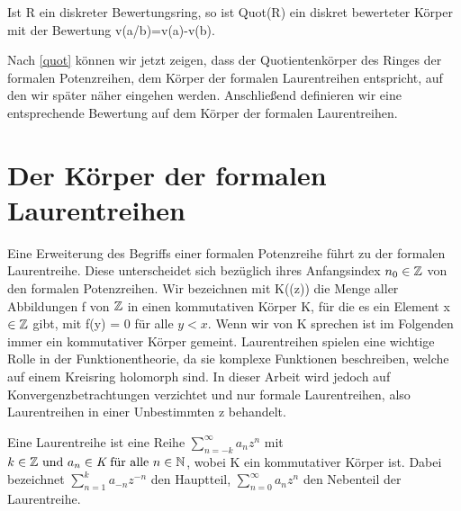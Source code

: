 \begin{satz}\label{quotbewring}
Ist R ein diskreter Bewertungsring, so ist Quot(R) ein diskret bewerteter Körper mit der Bewertung v(a/b)=v(a)-v(b). 
\end{satz}
Nach \ref{quot} können wir jetzt zeigen, dass der Quotientenkörper des Ringes der formalen Potenzreihen, dem Körper der formalen Laurentreihen entspricht, auf den wir später näher eingehen werden. Anschließend definieren wir eine entsprechende Bewertung auf dem Körper der formalen Laurentreihen.


\section{Der Körper der formalen Laurentreihen}
%
Eine Erweiterung des Begriffs einer formalen Potenzreihe führt zu der formalen Laurentreihe. Diese unterscheidet sich bezüglich ihres Anfangsindex $n_0 \in \mathbb{Z}$ von den formalen Potenzreihen. Wir bezeichnen mit K((z)) die Menge aller Abbildungen f von $\mathbb{Z}$ in einen kommutativen Körper K, für die es ein Element x $\in \mathbb{Z}$ gibt, mit f(y) = 0 für alle $y < x $. Wenn wir von K sprechen ist im Folgenden immer ein kommutativer Körper gemeint. \newline 
Laurentreihen spielen eine wichtige Rolle in der Funktionentheorie, da sie komplexe Funktionen beschreiben, welche auf einem Kreisring holomorph sind. In dieser Arbeit wird jedoch auf Konvergenzbetrachtungen verzichtet und nur formale Laurentreihen, also Laurentreihen in einer Unbestimmten z behandelt. %

%
\begin{defn}
Eine Laurentreihe ist eine Reihe $\sum_{n= - k}^{\infty}a_nz^n$ mit $k \in \mathbb{Z} \text{ und }a_n \in\textit{K}\text{ für alle } n\in\mathbb{N} $, wobei K ein kommutativer Körper ist. Dabei bezeichnet $\sum_{n=1}^{k}a_{-n}z^{-n}$ den Hauptteil, $\sum_{n=0}^{\infty}a_nz^n$ den Nebenteil der Laurentreihe. 
\end{defn}
%
 
